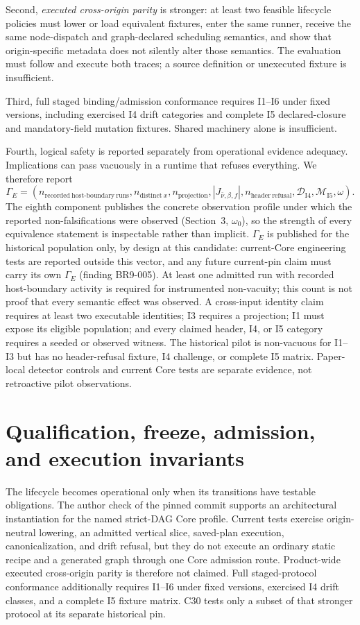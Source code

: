 \documentclass[11pt]{article}
\begin{document}
Second, \emph{executed cross-origin parity} is stronger: at least two feasible
lifecycle policies must lower or load equivalent fixtures, enter the same
runner, receive the same node-dispatch and graph-declared scheduling
semantics, and show that origin-specific metadata does not silently alter
those semantics. The evaluation must follow and execute both traces; a source
definition or unexecuted fixture is insufficient.

Third, full staged binding/admission conformance requires I1--I6 under fixed
versions, including exercised I4 drift categories and complete I5
declared-closure and mandatory-field mutation fixtures. Shared machinery alone
is insufficient.

Fourth, logical safety is reported separately from operational evidence
adequacy. Implications can pass vacuously in a runtime that refuses everything.
We therefore report
\[
\Gamma_E=(n_{\mathrm{recorded\ host\mbox{-}boundary\ runs}},n_{\mathrm{distinct}\ x},
n_{\mathrm{projection}},|J_{\bar\nu,\beta,f}|,
n_{\mathrm{header\ refusal}},\mathcal D_{\mathrm{I4}},
\mathcal M_{\mathrm{I5}},\omega).
\]
The eighth component publishes the concrete observation profile under which
the reported non-falsifications were observed (Section~3, \(\omega_{0}\)),
so the strength of every equivalence statement is inspectable rather than
implicit. \(\Gamma_E\) is published for the historical population only, by
design at this candidate: current-Core engineering tests are reported outside
this vector, and any future current-pin claim must carry its own
\(\Gamma_E\) (finding BR9-005).
At least one admitted run with recorded host-boundary activity is required for
instrumented non-vacuity; this count is not proof that every semantic effect
was observed. A
cross-input identity claim requires at least two executable identities; I3
requires a projection; I1 must expose its eligible population; and every
claimed header, I4, or I5 category requires a seeded or observed witness. The
historical pilot is non-vacuous for I1--I3 but has no header-refusal fixture, I4
challenge, or complete I5 matrix. Paper-local detector controls and
current Core tests are separate evidence, not retroactive pilot observations.

\section{Qualification, freeze, admission, and execution invariants}

The lifecycle becomes operational only when its transitions have testable
obligations. The author check of the pinned commit supports an architectural
instantiation for the named strict-DAG Core profile. Current tests
exercise origin-neutral lowering, an admitted vertical slice, saved-plan
execution, canonicalization, and drift refusal, but they do not execute an
ordinary static recipe and a generated graph through one Core admission route.
Product-wide executed cross-origin parity is therefore not claimed. Full
staged-protocol conformance additionally requires I1--I6 under fixed versions,
exercised I4 drift classes, and a complete I5 fixture matrix. C30 tests only a
subset of that stronger protocol at its separate historical pin.
\end{document}
